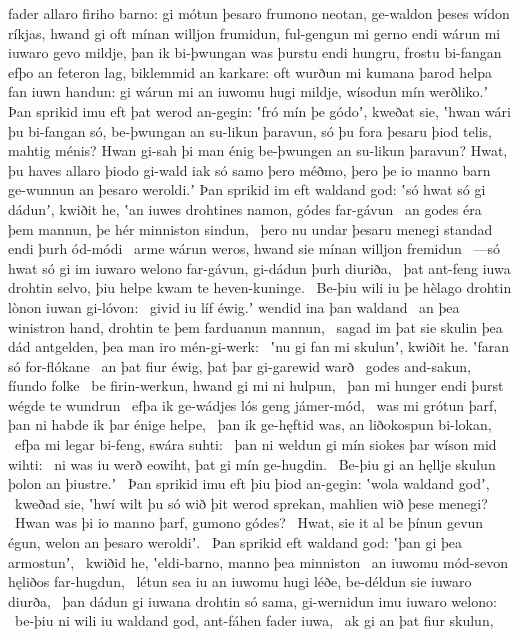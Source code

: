 fader allaro firiho barno: gi mótun þesaro frumono neotan,
ge-waldon þeses wídon ríkjas, hwand gi oft mínan willjon frumidun,
ful-gengun mi gerno endi wárun mi iuwaro gevo mildje,
þan ik bi-þwungan was þurstu endi hungru,
frostu bi-fangan efþo an feteron lag,
biklemmid an karkare: oft wurðun mi kumana þarod
helpa fan iuwn handun: gi wárun mi an iuwomu hugi mildje,
wísodun mín werðliko.ʼ Þan sprikid imu eft þat werod an-gegin:
ʽfró mín þe gódoʼ, kweðat sie, ʽhwan wári þu bi-fangan só,
be-þwungan an su-likun þaravun, só þu fora þesaru þiod telis,
mahtig ménis? Hwan gi-sah þi man énig
be-þwungen an su-likun þaravun? Hwat, þu haves allaro þiodo gi-wald
iak só samo þero méðmo, þero þe io manno barn
ge-wunnun an þesaro weroldi.ʼ Þan sprikid im eft waldand god:
ʽsó hwat só gi dádunʼ, kwiðit he, ʽan iuwes drohtines namon,
gódes far-gávun \hld\ an godes éra
þem mannun, þe hér minniston sindun, \hld\ þero nu undar þesaru menegi standad
endi þurh ód-módi \hld\ arme wárun
weros, hwand sie mínan willjon fremidun \hld\ —só hwat só gi im iuwaro welono far-gávun,
gi-dádun þurh diuriða, \hld\ þat ant-feng iuwa drohtin selvo,
þiu helpe kwam te heven-kuninge. \hld\ Be-þiu wili iu þe hèlago drohtin
lònon iuwan gi-lóvon: \hld\ givid iu líf éwig.ʼ
wendid ina þan waldand \hld\ an þea winistron hand,
drohtin te þem farduanun mannun, \hld\ sagad im þat sie skulin þea dád antgelden,
þea man iro mén-gi-werk: \hld\ ʽnu gi fan mi skulunʼ, kwiðit he.
ʽfaran só for-flókane \hld\ an þat fiur éwig,
þat þar gi-garewid warð \hld\ godes and-sakun,
fíundo folke \hld\ be firin-werkun,
hwand gi mi ni hulpun, \hld\ þan mi hunger endi þurst
wégde te wundrun \hld\ efþa ik ge-wádjes lós
geng jámer-mód, \hld\ was mi grótun þarf,
þan ni habde ik þar énige helpe, \hld\ þan ik ge-hęftid was,
an liðokospun bi-lokan, \hld\ efþa mi legar bi-feng,
swára suhti: \hld\ þan ni weldun gi mín siokes þar
wíson mid wihti: \hld\ ni was iu werð eowiht,
þat gi mín ge-hugdin. \hld\ Be-þiu gi an hęllje skulun
þolon an þiustre.ʼ \hld\ Þan sprikid imu eft þiu þiod an-gegin:
ʽwola waldand godʼ, \hld\ kweðad sie, ʽhwí wilt þu só wið þit werod sprekan,
mahlien wið þese menegi? \hld\ Hwan was þi io manno þarf,
gumono gódes? \hld\ Hwat, sie it al be þínun gevun égun,
welon an þesaro weroldiʼ. \hld\ Þan sprikid eft waldand god:
ʽþan gi þea armostunʼ, \hld\ kwiðid he, ʽeldi-barno,
manno þea minniston \hld\ an iuwomu mód-sevon
hęliðos far-hugdun, \hld\ létun sea iu an iuwomu hugi léðe,
be-déldun sie iuwaro diurða, \hld\ þan dádun gi iuwana drohtin só sama,
gi-wernidun imu iuwaro welono: \hld\ be-þiu ni wili iu waldand god,
ant-fáhen fader iuwa, \hld\ ak gi an þat fiur skulun,
